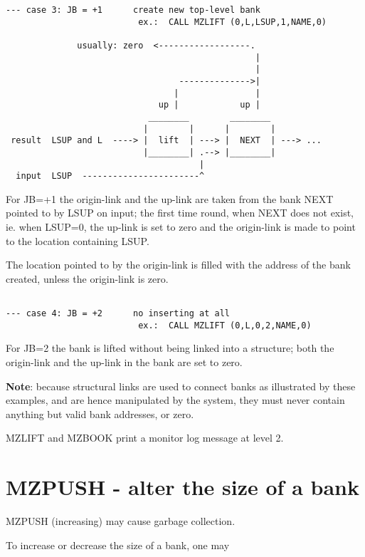 \begin{verbatim}
--- case 3: JB = +1      create new top-level bank
                          ex.:  CALL MZLIFT (0,L,LSUP,1,NAME,0)

              usually: zero  <------------------.
                                                 |
                                                 |
                                  -------------->|
                                 |               |
                              up |            up |
                            ________        ________
                           |        |      |        |
 result  LSUP and L  ----> |  lift  | ---> |  NEXT  | ---> ...
                           |________| .--> |________|
                                      |
  input  LSUP  -----------------------^
\end{verbatim} 
For  JB=+1  the origin-link and the up-link are taken from
the bank NEXT pointed to by LSUP on input;
the first time round, when NEXT does not exist,
ie. when LSUP=0,
the up-link is set to zero and the origin-link is made to point
to the location containing LSUP.

The location pointed to by the origin-link is filled with the address
of the bank created, unless the origin-link is zero.
\begin{verbatim}

--- case 4: JB = +2      no inserting at all
                          ex.:  CALL MZLIFT (0,L,0,2,NAME,0)
\end{verbatim} 
For  JB=2  the bank is lifted without being linked into a structure;
both the origin-link and the up-link in the bank are set to zero. \vspace{8mm}

{\large\bf Note}: because structural links are used to connect banks as
illustrated by these examples, and are hence manipulated by the system,
they must never contain anything but valid bank addresses, or zero.

MZLIFT and MZBOOK print a monitor log message at level 2.

\section{MZPUSH - alter the size of a bank}

MZPUSH (increasing) may cause garbage collection.

To increase or decrease the size of a bank, one may

